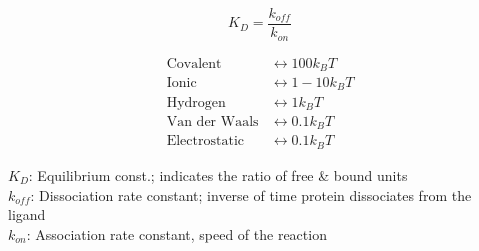 \begin{minipage}{0.5\linewidth}
    \[
    \boxed{        
            K_D = \frac{k_{off}}{k_{on}}
    }
    \]
\end{minipage}\begin{minipage}{0.4\linewidth}
\begin{align*}
    \text{Covalent} &\longleftrightarrow 100 k_B T\\
    \text{Ionic} &\longleftrightarrow 1-10 k_B T\\
    \text{Hydrogen} &\longleftrightarrow 1 k_B T\\
    \text{Van der Waals} &\longleftrightarrow 0.1 k_B T\\
    \text{Electrostatic} &\longleftrightarrow 0.1 k_B T
\end{align*}
\end{minipage} 

    $K_D$: Equilibrium const.; indicates the ratio of free \& bound units\\
    $k_{off}$: Dissociation rate constant; inverse of time protein dissociates from the ligand\\
    $k_{on}$: Association rate constant, speed of the reaction

